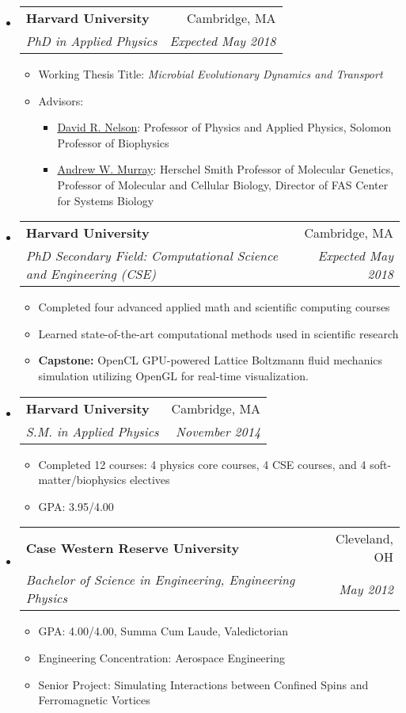 \documentclass[letterpaper,11pt]{article}
\makeatletter
\newcommand{\resitem}[1]{\item #1 \vspace{-2pt}}
\newcommand{\ressubheading}[4]{\vspace{-14pt}
\begin{tabular*}{7.0in}{l@{\extracolsep{\fill}}r}
                \\
                \textbf{#1} & #2 \\
                \textit{#3} & \textit{#4} \\
\end{tabular*}\vspace{-6pt}}
\makeatother
\begin{document}
\begin{itemize}
\item
\ressubheading{Harvard University}{Cambridge, MA}{PhD in Applied Physics}{Expected May 2018}     

\begin{itemize}
\resitem{Working Thesis Title: \textit{Microbial Evolutionary Dynamics and Transport}}
\resitem{Advisors:}

\begin{itemize}
\resitem{\href{http://www.seas.harvard.edu/directory/nelson}{David R. Nelson}: Professor of Physics and Applied Physics, Solomon Professor of Biophysics}
\resitem{\href{https://www.mcb.harvard.edu/mcb/faculty/profile/andrew-w-murray/}{Andrew W. Murray}: Herschel Smith Professor of Molecular Genetics,
Professor of Molecular and Cellular Biology,
Director of FAS Center for Systems Biology}
\end{itemize}

\end{itemize}

\item \ressubheading{Harvard University}{Cambridge, MA}{PhD Secondary Field: Computational Science and Engineering (CSE)}{Expected May 2018}           

\begin{itemize}
\resitem{Completed four advanced applied math and scientific computing courses}
\resitem{Learned state-of-the-art computational methods used in scientific research}
\resitem{\textbf{Capstone:} OpenCL GPU-powered Lattice Boltzmann fluid mechanics simulation utilizing OpenGL for real-time visualization.  }
\end{itemize}                   

\item \ressubheading{Harvard University}{Cambridge, MA}{S.M. in Applied Physics}{November 2014}           

\begin{itemize}
\resitem{Completed 12 courses: 4 physics core courses, 4 CSE courses, and 4 soft-matter/biophysics electives}
\resitem{GPA: 3.95/4.00}
\end{itemize}
\item
        \ressubheading{Case Western Reserve University}{Cleveland, OH}{Bachelor of Science in Engineering, Engineering Physics}{May 2012}
        \begin{itemize}
                \resitem{GPA: 4.00/4.00, Summa Cum Laude, Valedictorian}
                \resitem{Engineering Concentration: Aerospace Engineering}
                \resitem{Senior Project: Simulating Interactions between Confined Spins and Ferromagnetic Vortices}
        \end{itemize}
\end{itemize}
\end{document}
